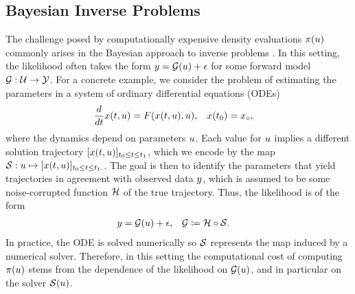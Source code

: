 \documentclass[12pt]{article}
\begin{document}
\subsection{Bayesian Inverse Problems}
The challenge posed by computationally expensive density evaluations $\pi(u)$ commonly 
arises in the Bayesian approach to inverse problems \citep{Stuart_BIP}. In this setting, 
the likelihood often takes the form $y = \mathcal{G}(u) + \epsilon$ for some forward model
$\mathcal{G}: \mathcal{U} \to \mathcal{Y}$. For a concrete example, we consider the problem of estimating the 
parameters in a system of ordinary differential equations (ODEs)
\begin{align}
\frac{d}{dt} x(t, u) &= F(x(t, u), u), &&x(t_0) = x_{\circ}, \label{ode_ivp}
\end{align}
where the dynamics depend on parameters $u$. Each value for $u$ implies a different solution trajectory
$[x(t, u)]_{t_0 \leq t \leq t_1}$, which we encode by the
map $\mathcal{S}: u \mapsto [x(t, u)]_{t_0 \leq t \leq t_1.}$. The goal is then 
to identify the parameters that yield trajectories in agreement with observed data 
$y$, which is assumed to be some noise-corrupted function $\mathcal{H}$ of the true trajectory. Thus, the 
likelihood is of the form 
\begin{align}
&y = \mathcal{G}(u) + \epsilon, &&\mathcal{G} \coloneqq \mathcal{H} \circ \mathcal{S}. \label{eq:additive-noise}
\end{align}
In practice, the ODE is solved numerically so $\mathcal{S}$ represents the map induced by a numerical 
solver. Therefore, in this setting the computational cost of computing $\pi(u)$ stems from the 
dependence of the likelihood on $\mathcal{G}(u)$, and in particular on the solver $\mathcal{S}(u)$.
\end{document}
